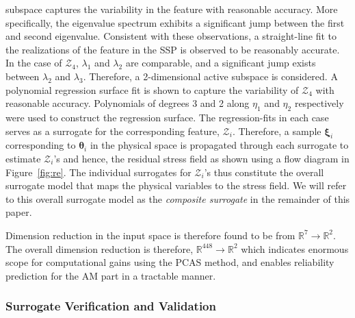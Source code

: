 subspace captures the variability in the feature with reasonable accuracy. More specifically, the
eigenvalue spectrum exhibits a significant jump between the first and second eigenvalue. Consistent
with these observations, a straight-line fit to the realizations of the feature in the SSP is observed to be
reasonably accurate. In the case of $\mathcal{Z}_4$, $\lambda_1$ and $\lambda_2$ are comparable, and
a significant jump exists between $\lambda_2$ and $\lambda_3$. Therefore, a 2-dimensional active
subspace is considered. A polynomial regression surface fit is shown to capture the variability of
$\mathcal{Z}_4$ with reasonable accuracy. Polynomials of degrees 3 and 2 along $\eta_1$ and
$\eta_2$ respectively were used to construct the regression surface. The regression-fits in each case
serves as a surrogate for the corresponding feature, $\mathcal{Z}_i$. Therefore, a sample $\bm{\xi}_i$
corresponding to $\bm{\theta}_i$ in the physical space is propagated through each surrogate to estimate
$\mathcal{Z}_i$'s and hence, the residual stress field as shown using a flow diagram in Figure~\ref{fig:re}.
The individual surrogates for $\mathcal{Z}_i$'s thus constitute the overall surrogate model that maps the 
physical variables to the stress field. We will refer to this overall surrogate model as the \textit{composite
surrogate} in the remainder of this paper. 

Dimension reduction in the input space is therefore found to be from $\mathbb{R}^7\rightarrow\mathbb{R}^2$.
The overall dimension reduction is therefore, $\mathbb{R}^{448}\rightarrow\mathbb{R}^2$ which indicates
enormous scope for computational gains using the PCAS method, and enables reliability prediction for the
AM part in a tractable manner. 

\subsubsection{Surrogate Verification and Validation}
\label{subsub:vnv}

